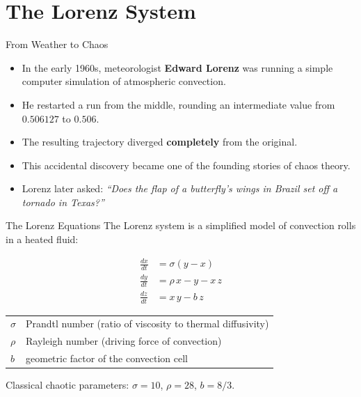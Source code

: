 \section{The Lorenz System}

\begin{frame}{From Weather to Chaos}
  \begin{itemize}
    \item In the early 1960s, meteorologist \textbf{Edward Lorenz} was running a simple computer simulation of atmospheric convection.
    \item He restarted a run from the middle, rounding an intermediate value from $0.506127$ to $0.506$.
    \item The resulting trajectory diverged \textbf{completely} from the original.
    \item This accidental discovery became one of the founding stories of chaos theory.
    \item Lorenz later asked: \textit{``Does the flap of a butterfly's wings in Brazil set off a tornado in Texas?''}
  \end{itemize}
\end{frame}

\begin{frame}{The Lorenz Equations}
  The Lorenz system is a simplified model of convection rolls in a heated fluid:

  \begin{align*}
    \frac{dx}{dt} &= \sigma (y - x) \\[6pt]
    \frac{dy}{dt} &= \rho\, x - y - x\,z \\[6pt]
    \frac{dz}{dt} &= x\,y - b\,z
  \end{align*}

  \vfill

  \begin{tabular}{ll}
    $\sigma$ & Prandtl number (ratio of viscosity to thermal diffusivity) \\
    $\rho$   & Rayleigh number (driving force of convection) \\
    $b$      & geometric factor of the convection cell
  \end{tabular}

  \vfill
  Classical chaotic parameters: $\sigma = 10$, $\rho = 28$, $b = 8/3$.
\end{frame}

